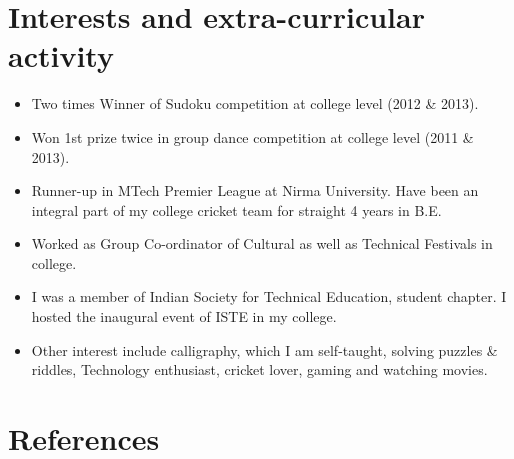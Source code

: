 \documentclass[11pt,a4paper,sans]{moderncv}        %
\begin{document}
\vspace{5pt}

\section{Interests and extra-curricular activity}

\vspace{3pt}

\begin{itemize}

\item{Two times Winner of Sudoku competition at college level (2012 \& 2013).}

\vspace{5pt}

\item{Won 1st prize twice in group dance competition at college level (2011 \& 2013).}

\vspace{5pt}

\item{Runner-up in MTech Premier League at Nirma University. Have been an integral part of my college cricket team for straight 4 years in B.E.}

\vspace{5pt}

\item{Worked as Group Co-ordinator of Cultural as well as Technical Festivals in college.}

\vspace{5pt}

\item{I was a member of Indian Society for Technical Education, student chapter. I hosted the inaugural event of ISTE in my college.}

\vspace{5pt}

\item{Other interest include calligraphy, which I am self-taught, solving puzzles \& riddles, Technology enthusiast, cricket lover, gaming and watching movies.}

\end{itemize}

\section{References}
\end{document}
